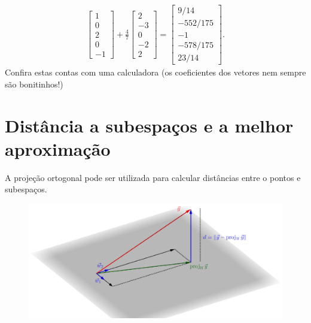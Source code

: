 \begin{ex}
\begin{align*}
\begin{bmatrix}
 1\\0\\2\\0\\-1
\end{bmatrix} + \frac{4}{7} \begin{bmatrix}
 2\\-3\\0\\-2\\ 2
\end{bmatrix} =
\begin{bmatrix}
 9/14 \\ -552/175 \\ -1 \\ -578/175 \\ 23/14
\end{bmatrix}.
  \end{align*}
Confira estas contas com uma calculadora (os coeficientes dos vetores nem sempre são bonitinhos!)
\end{ex}



\section{Distância a subespaços e a melhor aproximação}


A projeção ortogonal pode ser utilizada para calcular distâncias entre o pontos e subespaços.

\begin{figure}[h!]
\begin{center}
\includegraphics[width=1\linewidth]{Semana12/semana12-dist}
\end{center}
\end{figure}

